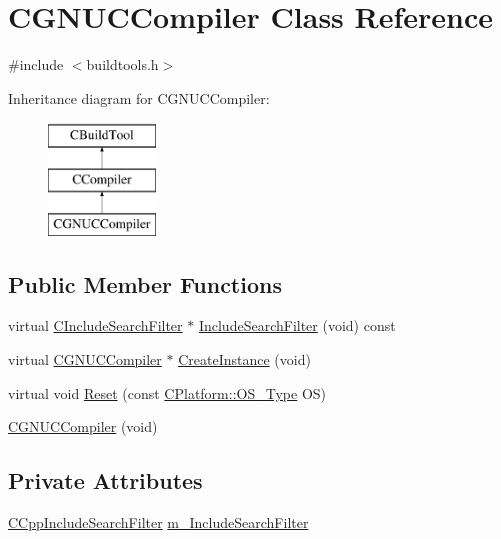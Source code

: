 \hypertarget{classCGNUCCompiler}{\section{C\-G\-N\-U\-C\-Compiler Class Reference}
\label{classCGNUCCompiler}
}


{\ttfamily \#include $<$buildtools.\-h$>$}

Inheritance diagram for C\-G\-N\-U\-C\-Compiler\-:\begin{figure}[H]
\begin{center}
\leavevmode
\includegraphics[height=3.000000cm]{db/d59/classCGNUCCompiler}
\end{center}
\end{figure}
\subsection*{Public Member Functions}
\begin{DoxyCompactItemize}
\item 
virtual \hyperlink{classCIncludeSearchFilter}{C\-Include\-Search\-Filter} $\ast$ \hyperlink{classCGNUCCompiler_a1dc37484a88684465d9bbfed8ee335e2}{Include\-Search\-Filter} (void) const 
\item 
virtual \hyperlink{classCGNUCCompiler}{C\-G\-N\-U\-C\-Compiler} $\ast$ \hyperlink{classCGNUCCompiler_ae69827132a9bc1170f2073bf4ded88bc}{Create\-Instance} (void)
\item 
virtual void \hyperlink{classCGNUCCompiler_a56fec9a27346838f33b3c444e90021f7}{Reset} (const \hyperlink{classCPlatform_a2fb735c63c53052f79629e338bb0f535}{C\-Platform\-::\-O\-S\-\_\-\-Type} O\-S)
\item 
\hyperlink{classCGNUCCompiler_a8f773f774ca44bc7cd0d6ef9e1e71211}{C\-G\-N\-U\-C\-Compiler} (void)
\end{DoxyCompactItemize}
\subsection*{Private Attributes}
\begin{DoxyCompactItemize}
\item 
\hyperlink{classCCppIncludeSearchFilter}{C\-Cpp\-Include\-Search\-Filter} \hyperlink{classCGNUCCompiler_ab89fb7c6abd00a9462fcd8334e4aab0a}{m\-\_\-\-Include\-Search\-Filter}
\end{DoxyCompactItemize}
